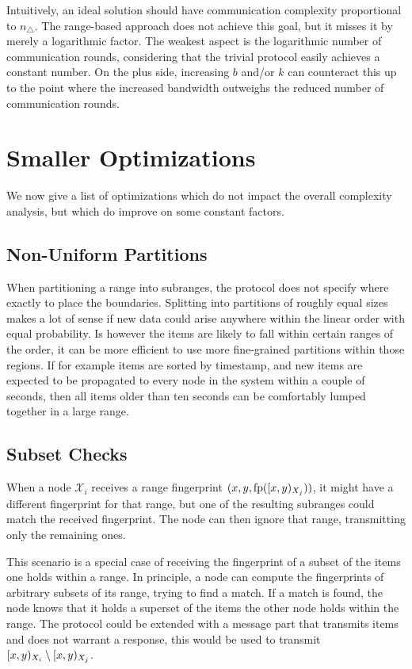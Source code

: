 Intuitively, an ideal solution should have communication complexity proportional to $n_{\triangle}$. The range-based approach does not achieve this goal, but it misses it by merely a logarithmic factor. The weakest aspect is the logarithmic number of communication rounds, considering that the trivial protocol easily achieves a constant number. On the plus side, increasing $b$ and/or $k$ can counteract this up to the point where the increased bandwidth outweighs the reduced number of communication rounds.

\section{Smaller Optimizations}
\label{set-reconciliation-simple-optimizations}

We now give a list of optimizations which do not impact the overall complexity analysis, but which do improve on some constant factors.

\subsection{Non-Uniform Partitions}

When partitioning a range into subranges, the protocol does not specify where exactly to place the boundaries. Splitting into partitions of roughly equal sizes makes a lot of sense if new data could arise anywhere within the linear order with equal probability. Is however the items are likely to fall within certain ranges of the order, it can be more efficient to use more fine-grained partitions within those regions. If for example items are sorted by timestamp, and new items are expected to be propagated to every node in the system within a couple of seconds, then all items older than ten seconds can be comfortably lumped together in a large range.

\subsection{Subset Checks}
\label{subset-checks}

When a node $\mathcal{X}_i$ receives a range fingerprint $({x}, {y}, {\operatorname{fp}([{x},{y})_{X_j})})$, it might have a different fingerprint for that range, but one of the resulting subranges could match the received fingerprint. The node can then ignore that range, transmitting only the remaining ones.

This scenario is a special case of receiving the fingerprint of a subset of the items one holds within a range. In principle, a node can compute the fingerprints of arbitrary subsets of its range, trying to find a match. If a match is found, the node knows that it holds a superset of the items the other node holds within the range. The protocol could be extended with a message part that transmits items and does not warrant a response, this would be used to transmit $[{x},{y})_{X_i} \setminus [{x},{y})_{X_j}$.

